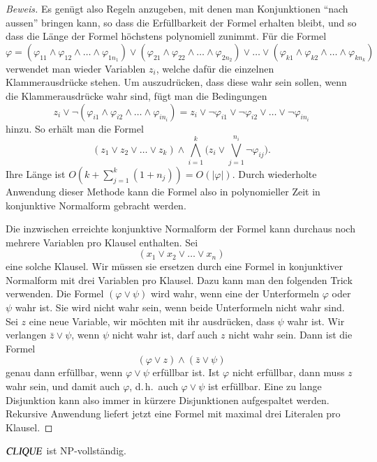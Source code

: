 \begin{proof}[Beweis]
Es genügt also Regeln anzugeben, mit denen man Konjunktionen
``nach aussen'' bringen kann, so dass die Erfüllbarkeit der
Formel erhalten bleibt, und so dass die Länge der Formel 
höchstens polynomiell zunimmt.
Für die Formel
\[
\varphi=
(
\varphi_{11}
\wedge
\varphi_{12}
\wedge
\dots
\wedge
\varphi_{1n_1}
)
\vee
(
\varphi_{21}
\wedge
\varphi_{22}
\wedge
\dots
\wedge
\varphi_{2n_2}
)
\vee\dots\vee
(
\varphi_{k1}
\wedge
\varphi_{k2}
\wedge
\dots
\wedge
\varphi_{kn_k}
)
\]
verwendet man wieder Variablen $z_i$, welche dafür die einzelnen
Klammerausdrücke stehen.
Um auszudrücken, dass diese wahr sein
sollen, wenn die Klammerausdrücke wahr sind, fügt man
die Bedingungen
\[
z_i\vee \neg
(
\varphi_{i1}
\wedge
\varphi_{i2}
\wedge
\dots
\wedge
\varphi_{in_i}
)
=
z_i\vee
\neg\varphi_{i1}
\vee
\neg\varphi_{i2}
\vee
\dots
\vee
\neg\varphi_{in_i}
\]
hinzu.
So erhält man die Formel
\[
(z_1\vee z_2\vee \dots\vee z_k)
\wedge
\bigwedge_{i=1}^k \biggl(z_i\vee \bigvee_{j=1}^{n_i} \neg\varphi_{ij}\biggr).
\]
Ihre Länge ist $O(k+\sum_{j=1}^k(1+n_j))=O(|\varphi|)$.
Durch wiederholte Anwendung dieser Methode kann die
Formel also in polynomieller Zeit in konjunktive Normalform gebracht
werden.

Die inzwischen erreichte konjunktive Normalform der Formel kann durchaus
noch mehrere Variablen pro Klausel enthalten.
Sei 
\[
(x_1\vee x_2\vee \dots\vee x_n)
\]
eine solche Klausel.
Wir müssen sie ersetzen durch eine
Formel in konjunktiver Normalform mit drei Variablen pro Klausel.
Dazu kann man den folgenden Trick verwenden.
Die Formel $(\varphi\vee\psi)$ wird wahr, wenn eine der Unterformeln
$\varphi$ oder $\psi$ wahr ist.
Sie wird nicht wahr sein, wenn beide Unterformeln nicht wahr sind.
Sei $z$ eine neue Variable,
wir möchten mit ihr ausdrücken, dass $\psi$ wahr ist.
Wir verlangen $\bar z \vee \psi$, wenn $\psi$ nicht wahr ist, darf auch $z$
nicht wahr sein.
Dann ist die Formel
\[
(\varphi \vee z)\wedge(\bar z\vee \psi)
\]
genau dann erfüllbar, wenn $\varphi\vee \psi$ erfüllbar ist.
Ist $\varphi$ nicht erfüllbar, dann muss $z$ wahr sein, und
damit auch $\varphi$, d.\,h.~auch $\varphi\vee\psi$ ist erfüllbar.
Eine zu lange Disjunktion kann also immer in kürzere Disjunktionen 
aufgespaltet werden.
Rekursive Anwendung liefert jetzt eine Formel
mit maximal drei Literalen pro Klausel.
\end{proof}

\begin{satz}
$\text{\textsl{CLIQUE}}$ ist NP-vollständig.
\end{satz}


